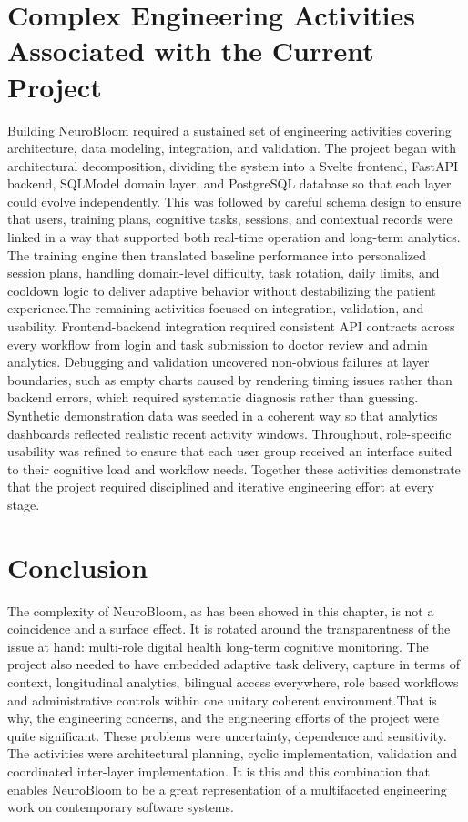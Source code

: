 \documentclass[12pt,a4paper]{report}
\begin{document}
\section{Complex Engineering Activities Associated with the Current Project}
Building NeuroBloom required a sustained set of engineering activities covering architecture, data modeling, integration, and validation. The project began with architectural decomposition, dividing the system into a Svelte frontend, FastAPI backend, SQLModel domain layer, and PostgreSQL database so that each layer could evolve independently. This was followed by careful schema design to ensure that users, training plans, cognitive tasks, sessions, and contextual records were linked in a way that supported both real-time operation and long-term analytics. The training engine then translated baseline performance into personalized session plans, handling domain-level difficulty, task rotation, daily limits, and cooldown logic to deliver adaptive behavior without destabilizing the patient experience.The remaining activities focused on integration, validation, and usability. Frontend-backend integration required consistent API contracts across every workflow from login and task submission to doctor review and admin analytics. Debugging and validation uncovered non-obvious failures at layer boundaries, such as empty charts caused by rendering timing issues rather than backend errors, which required systematic diagnosis rather than guessing. Synthetic demonstration data was seeded in a coherent way so that analytics dashboards reflected realistic recent activity windows. Throughout, role-specific usability was refined to ensure that each user group received an interface suited to their cognitive load and workflow needs. Together these activities demonstrate that the project required disciplined and iterative engineering effort at every stage.

\section{Conclusion}
The complexity of NeuroBloom, as has been showed in this chapter, is not a coincidence and a surface effect. It is rotated around the transparentness of the issue at hand: multi-role digital health long-term cognitive monitoring. The project also needed to have embedded adaptive task delivery, capture in terms of context, longitudinal analytics, bilingual access everywhere, role based workflows and administrative controls within one unitary coherent environment.That is why, the engineering concerns, and the engineering efforts of the project were quite significant. These problems were uncertainty, dependence and sensitivity. The activities were architectural planning, cyclic implementation, validation and coordinated inter-layer implementation. It is this and this combination that enables NeuroBloom to be a great representation of a multifaceted engineering work on contemporary software systems.
\end{document}
